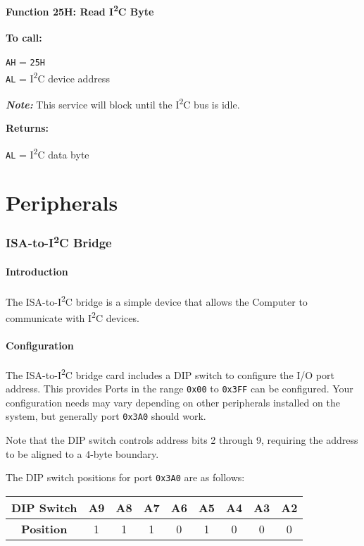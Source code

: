 \documentclass[twoside,10pt,letterpaper]{refart}
\newcommand{\forceindent}[1][3em]{\leavevmode{\parindent=#1\indent}}
\newcommand{\itwoc}{I\textsuperscript{2}C}
\begin{document}
\subsection{Function 25H: Read \itwoc{} Byte}
\textbf{To call:}

\forceindent \texttt{AH} = \texttt{25H} \\
\forceindent \texttt{AL} = \itwoc{} device address

\forceindent \textit{\textbf{Note:}} This service will block until the \itwoc{} bus is idle.

\textbf{Returns:}

\forceindent \texttt{AL} = \itwoc{} data byte

\newpage

\part{Peripherals}

\section{ISA-to-\itwoc{} Bridge}

\subsection{Introduction}
The ISA-to-\itwoc{} bridge is a simple device that allows the  Computer to communicate
with \itwoc{} devices.

\subsection{Configuration}
The ISA-to-\itwoc{} bridge card includes a DIP switch to configure the I/O port address. This provides
Ports in the range \texttt{0x00} to \texttt{0x3FF} can be configured. Your configuration needs may
vary depending on other peripherals installed on the system, but generally port \texttt{0x3A0} should
work.

Note that the DIP switch controls address bits 2 through 9, requiring the address to be aligned to
a 4-byte boundary.

The DIP switch positions for port \texttt{0x3A0} are as follows:

\begin{center}
    \begin{tabular}{ c|c|c|c|c|c|c|c|c }
        \textbf{DIP Switch} & A9 & A8 & A7 & A6 & A5 & A4 & A3 & A2 \\
        \hline
        \textbf{Position} & 1 & 1 & 1 & 0 & 1 & 0 & 0 & 0
    \end{tabular}
\end{center}
\end{document}

